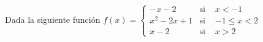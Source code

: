 \documentclass[addpoints,spanish, 12pt,a4paper]{exam}
\begin{document}
\begin{questions}

\question  Dada la siguiente función $f(x) =
\left\{
	\begin{array}{clc}
		-x -2  & \mbox{si } & x < -1 \\
		x^2-2x+1 & \mbox{si } & -1 \leq x < 2 \\
		x-2 & \mbox{si } & x > 2
	\end{array}
\right.$
\begin{parts} 

\end{parts}
\end{questions}
\end{document}
